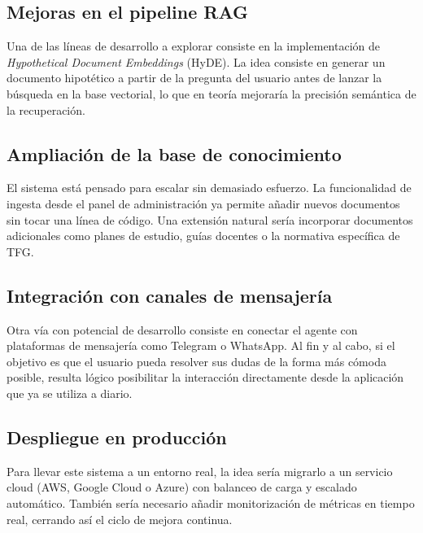 \documentclass[12pt,a4paper,oneside]{report}
\begin{document}
\subsection*{Mejoras en el pipeline RAG}

Una de las líneas de desarrollo a explorar consiste en la implementación de \textit{Hypothetical Document Embeddings} (HyDE). La idea consiste en generar un documento hipotético a partir de la pregunta del usuario antes de lanzar la búsqueda en la base vectorial, lo que en teoría mejoraría la precisión semántica de la recuperación.

\subsection*{Ampliación de la base de conocimiento}

El sistema está pensado para escalar sin demasiado esfuerzo. La funcionalidad de ingesta desde el panel de administración ya permite añadir nuevos documentos sin tocar una línea de código. Una extensión natural sería incorporar documentos adicionales como planes de estudio, guías docentes o la normativa específica de TFG.

\subsection*{Integración con canales de mensajería}

Otra vía con potencial de desarrollo consiste en conectar el agente con plataformas de mensajería como Telegram o WhatsApp. Al fin y al cabo, si el objetivo es que el usuario pueda resolver sus dudas de la forma más cómoda posible, resulta lógico posibilitar la interacción directamente desde la aplicación que ya se utiliza a diario.

\subsection*{Despliegue en producción}

Para llevar este sistema a un entorno real, la idea sería migrarlo a un servicio cloud (AWS, Google Cloud o Azure) con balanceo de carga y escalado automático. También sería necesario añadir monitorización de métricas en tiempo real, cerrando así el ciclo de mejora continua.
\end{document}
